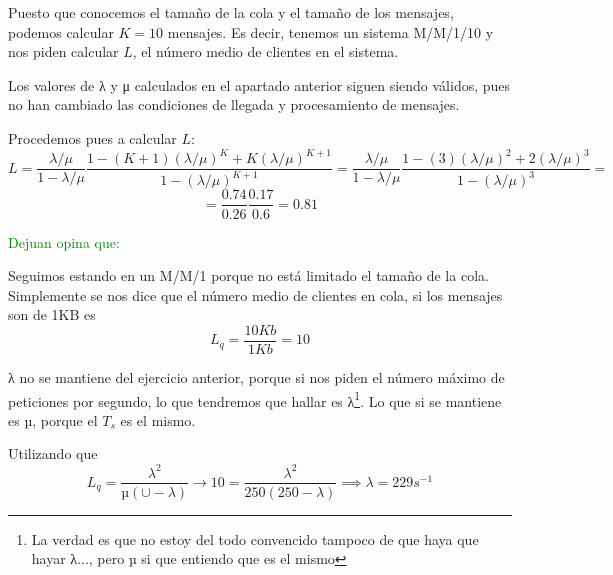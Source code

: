 \begin{problem}[6]
Puesto que conocemos el tamaño de la cola y el tamaño de los mensajes, podemos calcular $K=10$ mensajes. Es decir, tenemos un sistema M/M/1/10 y nos piden calcular $L$, el número medio de clientes en el sistema.

Los valores de λ y μ calculados en el apartado anterior siguen siendo válidos, pues no han cambiado las condiciones de llegada y procesamiento de mensajes.

Procedemos pues a calcular $L$:
\[L = \frac{λ/μ}{1-λ/μ}\frac{1-(K+1)(λ/μ)^K+K(λ/μ)^{K+1}}{1-(λ/μ)^{K+1}}=\frac{λ/μ}{1-λ/μ}\frac{1-(3)(λ/μ)^2+2(λ/μ)^{3}}{1-(λ/μ)^{3}}=\]
\[=\frac{0.74}{0.26}\frac{0.17}{0.6}=\boxed{0.81}\]

 \textcolor{green}{Dejuan opina que:}

Seguimos estando en un M/M/1 porque no está limitado el tamaño de la cola. Simplemente se nos dice que el número medio de clientes en cola, si los mensajes son de 1KB es \[L_q = \frac{10Kb}{1Kb}=10\]

λ no se mantiene del ejercicio anterior, porque si nos piden el número máximo de peticiones por segundo, lo que tendremos que hallar es λ\footnote{La verdad es que no estoy del todo convencido tampoco de que haya que hayar λ..., pero µ si que entiendo que es el mismo}. Lo que si se mantiene es µ, porque el $T_s$ es el mismo.


Utilizando que \[L_q = \frac{λ^2}{µ(∪-λ)} \to 10 = \frac{λ^2}{250(250-λ)} \implies λ=229s^{-1}\]

\end{problem}


